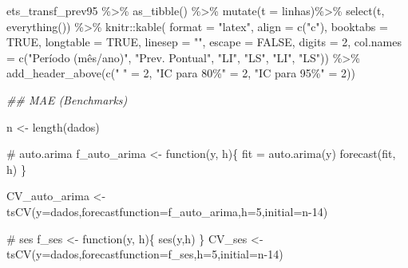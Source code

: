 \documentclass[
  letterpaper,
  DIV=11,
  numbers=noendperiod]{scrartcl}
\newenvironment{Shaded}{\begin{snugshade}}{\end{snugshade}}
\newcommand{\AttributeTok}[1]{\textcolor[rgb]{0.40,0.45,0.13}{#1}}
\newcommand{\CommentTok}[1]{\textcolor[rgb]{0.37,0.37,0.37}{#1}}
\newcommand{\ConstantTok}[1]{\textcolor[rgb]{0.56,0.35,0.01}{#1}}
\newcommand{\ControlFlowTok}[1]{\textcolor[rgb]{0.00,0.23,0.31}{#1}}
\newcommand{\DecValTok}[1]{\textcolor[rgb]{0.68,0.00,0.00}{#1}}
\newcommand{\DocumentationTok}[1]{\textcolor[rgb]{0.37,0.37,0.37}{\textit{#1}}}
\newcommand{\FunctionTok}[1]{\textcolor[rgb]{0.28,0.35,0.67}{#1}}
\newcommand{\NormalTok}[1]{\textcolor[rgb]{0.00,0.23,0.31}{#1}}
\newcommand{\OtherTok}[1]{\textcolor[rgb]{0.00,0.23,0.31}{#1}}
\newcommand{\SpecialCharTok}[1]{\textcolor[rgb]{0.37,0.37,0.37}{#1}}
\newcommand{\StringTok}[1]{\textcolor[rgb]{0.13,0.47,0.30}{#1}}
\begin{document}
\begin{Shaded}
\begin{Highlighting}[]
\NormalTok{ets\_transf\_prev95 }\SpecialCharTok{\%\textgreater{}\%} 
  \FunctionTok{as\_tibble}\NormalTok{() }\SpecialCharTok{\%\textgreater{}\%}
  \FunctionTok{mutate}\NormalTok{(}\AttributeTok{t =}\NormalTok{ linhas)}\SpecialCharTok{\%\textgreater{}\%}
  \FunctionTok{select}\NormalTok{(t, }\FunctionTok{everything}\NormalTok{()) }\SpecialCharTok{\%\textgreater{}\%}
\NormalTok{  knitr}\SpecialCharTok{::}\FunctionTok{kable}\NormalTok{(}
      \AttributeTok{format =} \StringTok{"latex"}\NormalTok{,}
      \AttributeTok{align =} \FunctionTok{c}\NormalTok{(}\StringTok{"c"}\NormalTok{),}
      \AttributeTok{booktabs =} \ConstantTok{TRUE}\NormalTok{,}
      \AttributeTok{longtable =} \ConstantTok{TRUE}\NormalTok{,}
      \AttributeTok{linesep =} \StringTok{""}\NormalTok{,}
      \AttributeTok{escape =} \ConstantTok{FALSE}\NormalTok{,}
      \AttributeTok{digits =} \DecValTok{2}\NormalTok{,}
      \AttributeTok{col.names =} \FunctionTok{c}\NormalTok{(}\StringTok{"Período (mês/ano)"}\NormalTok{, }\StringTok{"Prev. Pontual"}\NormalTok{, }\StringTok{"LI"}\NormalTok{, }\StringTok{"LS"}\NormalTok{, }\StringTok{"LI"}\NormalTok{, }\StringTok{"LS"}\NormalTok{)) }\SpecialCharTok{\%\textgreater{}\%}
    \FunctionTok{add\_header\_above}\NormalTok{(}\FunctionTok{c}\NormalTok{(}\StringTok{" "} \OtherTok{=} \DecValTok{2}\NormalTok{, }\StringTok{"IC para 80\%"} \OtherTok{=} \DecValTok{2}\NormalTok{, }\StringTok{"IC para 95\%"} \OtherTok{=} \DecValTok{2}\NormalTok{))}

\DocumentationTok{\#\# MAE (Benchmarks)}

\NormalTok{n }\OtherTok{\textless{}{-}} \FunctionTok{length}\NormalTok{(dados)}

\CommentTok{\# auto.arima}
\NormalTok{f\_auto\_arima }\OtherTok{\textless{}{-}} \ControlFlowTok{function}\NormalTok{(y, h)\{}
\NormalTok{  fit }\OtherTok{=} \FunctionTok{auto.arima}\NormalTok{(y)}
  \FunctionTok{forecast}\NormalTok{(fit, h)}
\NormalTok{\}}

\NormalTok{CV\_auto\_arima }\OtherTok{\textless{}{-}} \FunctionTok{tsCV}\NormalTok{(}\AttributeTok{y=}\NormalTok{dados,}\AttributeTok{forecastfunction=}\NormalTok{f\_auto\_arima,}\AttributeTok{h=}\DecValTok{5}\NormalTok{,}\AttributeTok{initial=}\NormalTok{n}\DecValTok{{-}14}\NormalTok{)}

\CommentTok{\# ses}
\NormalTok{f\_ses }\OtherTok{\textless{}{-}} \ControlFlowTok{function}\NormalTok{(y, h)\{}
  \FunctionTok{ses}\NormalTok{(y,h)}
\NormalTok{\}}
\NormalTok{CV\_ses }\OtherTok{\textless{}{-}} \FunctionTok{tsCV}\NormalTok{(}\AttributeTok{y=}\NormalTok{dados,}\AttributeTok{forecastfunction=}\NormalTok{f\_ses,}\AttributeTok{h=}\DecValTok{5}\NormalTok{,}\AttributeTok{initial=}\NormalTok{n}\DecValTok{{-}14}\NormalTok{)}


\end{Highlighting}
\end{Shaded}
\end{document}
